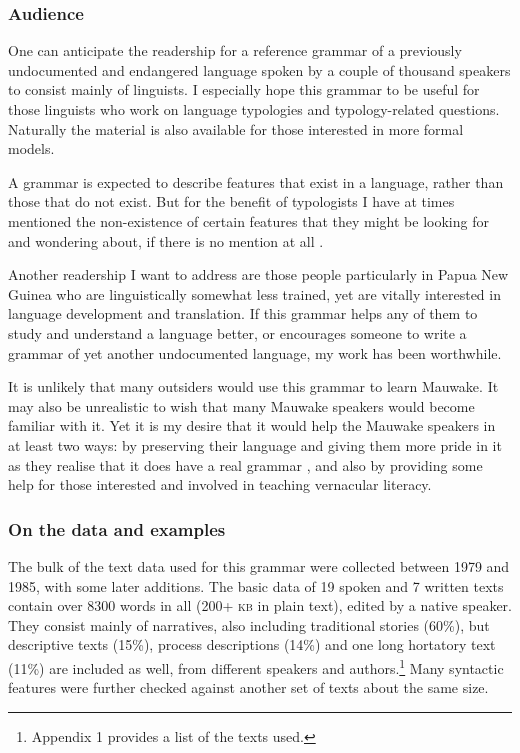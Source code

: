 \subsubsection{Audience} 
One can anticipate the readership for a reference grammar of a previously undocumented and endangered language spoken by a couple of thousand speakers to consist mainly of linguists.  I especially hope this grammar to be useful for those linguists who work on language typologies and typology-related questions. Naturally the material is also available for those interested in more formal models.

A grammar is expected to describe features that exist in a language, rather than those that do not exist. But for the benefit of typologists I have at times mentioned the non-existence of certain features that they might be looking for and wondering about, if there is no mention at all \citep{Cristofaro2006}. 

Another readership I want to address are those people particularly in Papua New Guinea who are linguistically somewhat less trained, yet are vitally interested in language development and translation.  If this grammar helps any of them to study and understand a language better, or encourages someone to write a grammar of yet another undocumented language, my work has been worthwhile.

It is unlikely that many outsiders would use this grammar to learn Mauwake.  It may also be unrealistic to wish that many Mauwake speakers would become familiar with it. Yet it is my desire that it would help the Mauwake speakers in at least two ways: by preserving their language and giving them more pride in it as they realise that it does have a real grammar \citep[255]{Kadanya2006}, and also by providing some help for those interested and involved in teaching vernacular literacy.

\subsubsection{On the data and examples} 
The bulk of the text data used for this grammar were collected between 1979 and 1985, with some later additions. The basic data of 19 spoken and 7 written texts contain over 8300 words in all (200+ \textsc{kb} in plain text), edited by a native speaker. They consist mainly of narratives, also including traditional stories (60\%), but descriptive texts (15\%), process descriptions (14\%) and one long hortatory text (11\%) are included as well, from different speakers and authors.\footnote{Appendix 1 provides a list of the texts used.} Many syntactic features were further checked against another set of texts about the same size. 

